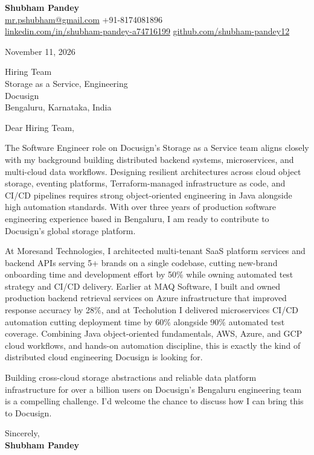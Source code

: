 \documentclass[a4paper,11pt]{article}
\begin{document}
\textbf{\Large Shubham Pandey}\\
\href{mailto:mr.pshubham@gmail.com}{mr.pshubham@gmail.com} \quad +91-8174081896\\
\href{https://www.linkedin.com/in/shubham-pandey-a74716199/}{linkedin.com/in/shubham-pandey-a74716199} \quad
\href{https://github.com/shubham-pandey12}{github.com/shubham-pandey12}

\vspace{1em}
November 11, 2026

\vspace{1em}
Hiring Team\\
Storage as a Service, Engineering\\
Docusign\\
Bengaluru, Karnataka, India

\vspace{1em}
Dear Hiring Team,

The Software Engineer role on Docusign's Storage as a Service team aligns closely with my background building distributed backend systems, microservices, and multi-cloud data workflows. Designing resilient architectures across cloud object storage, eventing platforms, Terraform-managed infrastructure as code, and CI/CD pipelines requires strong object-oriented engineering in Java alongside high automation standards. With over three years of production software engineering experience based in Bengaluru, I am ready to contribute to Docusign's global storage platform.

At Moresand Technologies, I architected multi-tenant SaaS platform services and backend APIs serving 5+ brands on a single codebase, cutting new-brand onboarding time and development effort by 50\% while owning automated test strategy and CI/CD delivery. Earlier at MAQ Software, I built and owned production backend retrieval services on Azure infrastructure that improved response accuracy by 28\%, and at Techolution I delivered microservices CI/CD automation cutting deployment time by 60\% alongside 90\% automated test coverage. Combining Java object-oriented fundamentals, AWS, Azure, and GCP cloud workflows, and hands-on automation discipline, this is exactly the kind of distributed cloud engineering Docusign is looking for.

Building cross-cloud storage abstractions and reliable data platform infrastructure for over a billion users on Docusign's Bengaluru engineering team is a compelling challenge. I'd welcome the chance to discuss how I can bring this to Docusign.

\vspace{1em}
Sincerely,\\[0.5em]
\textbf{Shubham Pandey}
\end{document}
